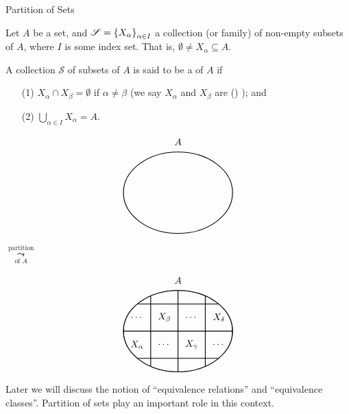 \vspace*{2em}

\begin{mdframed}
\begin{center}
{\Large Partition of Sets}\label{partition}
\end{center}
\end{mdframed}

Let $A$ be a set, and $\mathscr{S} = \left\{X_\alpha\right\}_{\alpha \in I}$ a collection (or family) of non-empty subsets of $A$, where $I$ is some index set. That is, $\emptyset \neq X_\alpha \subseteq A$.

\begin{definition}[Partitions]
A collection $\mathscr{S}$ of subsets of $A$ is said to be a  of $A$ if
\begin{itemize}
\item[(1)] $X_\alpha \cap X_\beta = \emptyset$ if $\alpha \neq \beta$ (we say $X_\alpha$ and $X_\beta$ are {\color{blue} () }); and
\item[(2)] $\bigcup_{\alpha \in I} X_\alpha = A$.
\end{itemize}
\begin{center}
\begin{minipage}{0.4\textwidth}
\[\begin{tikzpicture}
	\node[label=above:{$A$}](A) at (0,1.5) {};	
	\draw[thick] (0,0) ellipse (2cm and 1.5cm);
\end{tikzpicture}\]
\end{minipage}$\overset{\text{partition}}{\underset{\text{of $A$}}{\leadsto}}$
\begin{minipage}{0.4\textwidth}
\[\begin{tikzpicture}
	\node[label=above:{$A$}](A) at (0,1.5) {};	
	\draw[thick] (0,0) ellipse (2cm and 1.5cm);
	\clip[draw] (0,0) ellipse (2cm and 1.5cm);
	\draw[thick] (-2,-2) grid (2,2);
	\node at (-1.5,-0.5) {$X_\alpha$};
	\node at (-0.5,+0.5) {$X_\beta$};
	\node at (+0.5,-0.5) {$X_\gamma$};
	\node at (+1.5,+0.5) {$X_\delta$};
	\node at (+0.5,+0.5) {$\cdots$};
	\node at (-0.5,-0.5) {$\cdots$};
	\node at (-1.5,+0.5) {$\cdots$};
	\node at (+1.5,-0.5) {$\cdots$};
\end{tikzpicture}\]
\end{minipage}
\end{center}

\vspace*{1em}

\begin{remark}
Later we will discuss the notion of ``equivalence relations'' and ``equivalence classes''. Partition of sets play an important role in this context.
\end{remark}
\end{definition}

